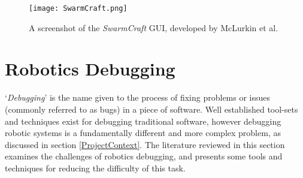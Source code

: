\begin{figure}
 \begin{center}
 \texttt{[image: SwarmCraft.png]}
 \decoRule
 \caption[Swarm Craft GUI. \cite{McLurkin:2006}]{A screenshot of the \textit{SwarmCraft} GUI, developed by McLurkin et al. \cite{McLurkin:2006}}
 \label{fig:SwarmCraft}
 \end{center}
\end{figure}


\section{Robotics Debugging} \label{RoboticsDebugging}
`\textit{Debugging}' is the name given to the process of fixing problems or issues (commonly referred to as bugs) in a piece of software. Well established tool-sets and techniques exist for debugging traditional software, however debugging robotic systems is a fundamentally different and more complex problem, as discussed in section \ref{ProjectContext}. The literature reviewed in this section examines the challenges of robotics debugging, and presents some tools and techniques for reducing the difficulty of this task.

